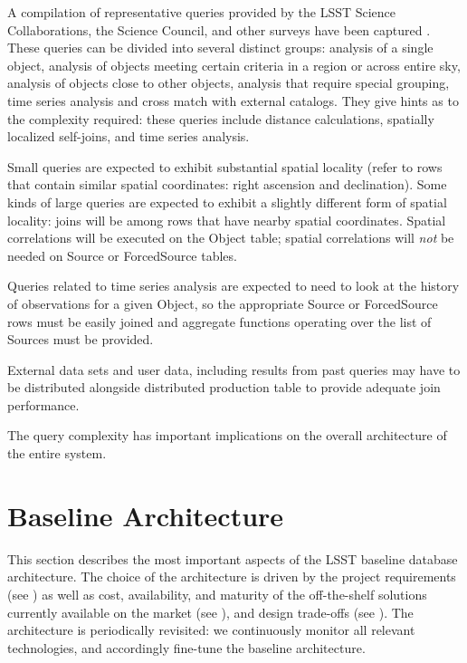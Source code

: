\documentclass[DM,toc]{lsstdoc}
\begin{document}
A compilation of representative queries provided by the LSST Science
Collaborations, the Science Council, and other surveys have been
captured \citep{CommonQueries}. These queries can be divided into
several distinct groups: analysis of a single object, analysis of
objects meeting certain criteria in a region or across entire sky,
analysis of objects close to other objects, analysis that require
special grouping, time series analysis and cross match with external
catalogs. They give hints as to the complexity required: these queries
include distance calculations, spatially localized self-joins, and time
series analysis.

Small queries are expected to exhibit substantial spatial locality
(refer to rows that contain similar spatial coordinates: right ascension
and declination). Some kinds of large queries are expected to exhibit a
slightly different form of spatial locality: joins will be among rows
that have nearby spatial coordinates. Spatial correlations will be
executed on the Object table; spatial correlations will \emph{not} be
needed on Source or ForcedSource tables.

Queries related to time series analysis are expected to need to look at
the history of observations for a given Object, so the appropriate
Source or ForcedSource rows must be easily joined and aggregate
functions operating over the list of Sources must be provided.

External data sets and user data, including results from past queries
may have to be distributed alongside distributed production table to
provide adequate join performance.

The query complexity has important implications on the overall
architecture of the entire system.

\section{Baseline Architecture}\label{baseline-architecture}

This section describes the most important aspects of the LSST baseline
database architecture. The choice of the architecture is driven by the project
requirements (see ) as well as cost, availability, and
maturity of the off-the-shelf solutions currently available on the market (see
), and design trade-offs (see ). The
architecture is periodically revisited: we continuously monitor all relevant
technologies, and accordingly fine-tune the baseline architecture.
\end{document}
